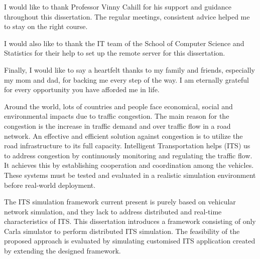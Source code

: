 \documentclass[a4paper, 12pt, oneside]{report}         %
\begin{document}

\thesistitlepage                                  %

\thesisdeclarationpage                %

\thesispermissionpage                 %


\begin{thesisacknowledgments}                     %
I would like to thank Professor Vinny Cahill for his support and guidance throughout this dissertation. The regular meetings, consistent advice helped me to stay on the right course.

I would also like to thank the IT team of the School of Computer Science and Statistics for their help to set up the remote server for this dissertation.

Finally, I would like to say a heartfelt thanks to my family and friends, especially my mom and dad, for backing me every step of the way. I am eternally grateful for every opportunity you have afforded me in life.                        %
\end{thesisacknowledgments}                       %

\begin{thesisabstract}                          %
Around the world, lots of countries and people face economical, social and environmental impacts due to traffic congestion. The main reason for the congestion is the increase in traffic demand and over traffic flow in a road network. An effective and efficient solution against congestion is to utilize the road infrastructure to its full capacity. Intelligent Transportation helps (ITS) us to address congestion by continuously monitoring and regulating the traffic flow. It achieves this by establishing cooperation and coordination among the vehicles. These systems must be tested and evaluated in a realistic simulation environment before real-world deployment. 

 The ITS simulation framework current present is purely based on vehicular network simulation, and they lack to address distributed and real-time characteristics of ITS. This dissertation introduces a framework consisting of only Carla simulator to perform distributed ITS simulation. The feasibility of the proposed approach is evaluated by simulating customised ITS application created by extending the designed framework.
\end{thesisabstract}
\end{document}
